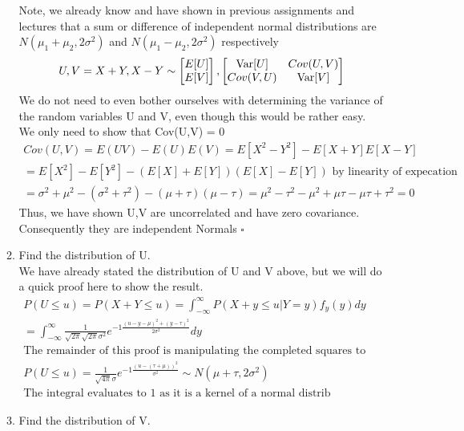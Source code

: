 \documentclass[11pt]{article}
\newcommand{\Var}{\mathop{\rm Var}}
\begin{document}
\begin{enumerate}
\begin{enumerate}
	Note, we already know and have shown in previous assignments and lectures that a sum or difference of independent normal distributions are $N(\mu_1+\mu_2,2\sigma^2)$ and $N(\mu_1-\mu_2,2\sigma^2)$ respectively
	\begin{gather}
		U,V = X+Y,X-Y \sim
		\begin{bmatrix}
		E[U] \\
		E[V]
		\end{bmatrix} , 
		\begin{bmatrix}
		\Var[U] & Cov(U,V) \\
		Cov(V,U) & \Var[V]
		\end{bmatrix} 
	\end{gather}
	We do not need to even bother ourselves with determining the variance of the random variables U and V, even though this would be rather easy. We only need to show that Cov(U,V) = 0\\
	\begin{gather}
		Cov(U,V)=E(UV)-E(U)E(V) = E[X^2-Y^2]-E[X+Y]E[X-Y] \\
		= E[X^2]-E[Y^2]-(E[X]+E[Y])(E[X]-E[Y]) \text{ by linearity of expecation}\\
		= \sigma^2 +\mu^2 - (\sigma^2 + \tau^2) - (\mu+\tau)(\mu - \tau) = \mu^2-\tau^2 - \mu^2 +\mu\tau - \mu\tau +\tau^2 = 0
	\end{gather}
	Thus, we have shown U,V are uncorrelated and have zero covariance. Consequently they are independent Normals $\square$
	\item Find the distribution of U. \\
	We have already stated the distribution of U and V above, but we will do a quick proof here to show the result.
	\begin{gather}
		P(U\le u) = P(X+Y\le u) = \int_{-\infty}^{\infty}P(X+y\le u|Y=y)f_y(y)dy\\
		=\int_{-\infty}^{\infty} \frac{1}{\sqrt{2\pi}\sqrt{2\pi}\sigma^2}e^{-1\frac{(u-y-\mu)^2+(y-\tau)^2}{2\sigma^2}}dy\\
		\text{The remainder of this proof is manipulating the completed squares to achieve the following}\\
		P(U\le u)= \frac{1}{\sqrt{4\pi}\sigma}e^{-1\frac{(u-(\tau + \mu))^2}{\sigma^2}} \sim N(\mu+\tau,2\sigma^2)\\
		\text{The integral evaluates to 1 as it is a kernel of a normal distrib}
	\end{gather}
	\item Find the distribution of V.\\

\end{enumerate}
\end{enumerate}
\end{document}
